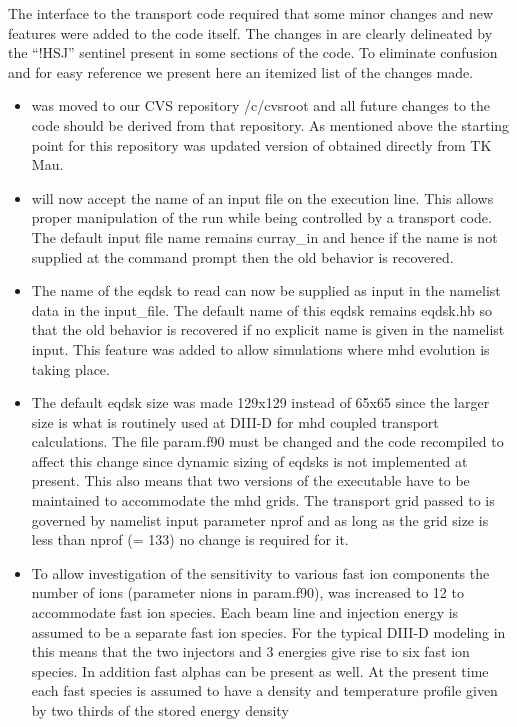  The interface to the \ot transport code required that
some minor changes and new features were added to the \ct code  itself. 
The changes in \ct are clearly delineated by the ``!HSJ''
sentinel  present in some sections of the code.
To eliminate confusion and for easy reference we present here an itemized
list of the changes made. 
 \begin {itemize}
  \item \ct was moved to our CVS repository /c/cvsroot and
  all future changes to the code should be derived from that
repository. As mentioned above the starting point for this repository
 was updated version of \ct obtained directly from TK Mau. 
\item \ct  will now accept the name of an input file
 on the execution line. This allows proper manipulation of the \ct run
 while being controlled by a transport code.
The default input file name remains  curray\_in and hence
 if the name is not supplied at the command prompt then the old
 behavior is recovered.
  \item The name of the eqdsk to read can now be supplied as
    input in the namelist data in the input\_file. The default name
  of this eqdsk remains eqdsk.hb so that the old behavior is
 recovered if no explicit name is given in the namelist input.
 This feature was added to allow simulations where mhd evolution is
 taking place.
 \item The default eqdsk size was made 129x129 instead of 65x65 
 since the larger size is what is routinely used at DIII-D for mhd
 coupled transport calculations.
  The file param.f90 must be changed and the code recompiled to
        affect this change since dynamic sizing of eqdsks is not
 implemented at present. This also means that two versions of the
\ct executable have to be maintained to accommodate the mhd grids.
The transport grid passed to \ct is governed by namelist input parameter nprof
and as long  as the grid size is less than nprof (= 133) no change 
is required for it. 
\item To allow investigation of  the sensitivity to various fast ion
  components the number of ions (parameter nions in param.f90), was increased
to 12 to accommodate fast ion species. Each beam line and injection energy
is assumed to be a separate fast ion species. For the typical DIII-D
modeling in \ot this means that the two injectors and 3 energies give
rise to six fast ion species. In addition fast alphas can be present
as well. At the present time each fast species is assumed to have a density and
temperature profile given by two thirds of the  stored energy density

\end{itemize}
